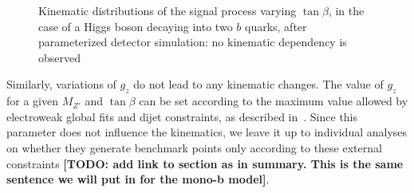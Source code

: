 
\begin{figure}[h!]
\centering
{}
\hfill
{}
\caption{Kinematic distributions of the signal process varying $\tan{\beta}$, in the case of a Higgs boson decaying into two $b$ quarks,
	after parameterized detector simulation: no kinematic dependency is observed}
\label{fig:DMH_tanbeta}
\end{figure}

Similarly, variations of $g_z$ do not lead to any kinematic changes. 
The value of $g_z$ for a given $M_{Z'}$ and $\tan \beta$ can be set according to the maximum value allowed by electroweak global 
fits and dijet constraints, as described in~\cite{Berlin:2014cfa}. Since this parameter does not influence the kinematics, 
we leave it up to individual analyses on whether they generate benchmark points only according to these external constraints
\textbf{[TODO: add link to section as in summary. This is the same sentence we will put in for the mono-b model]}.   

